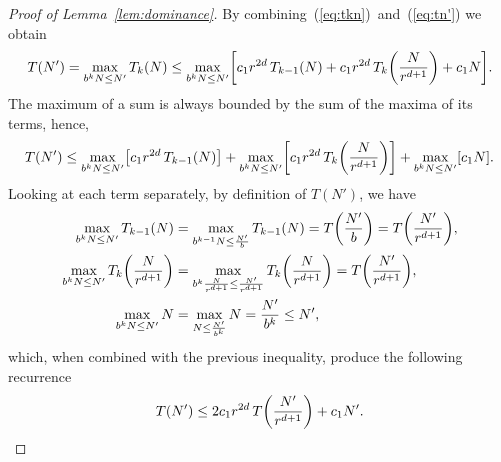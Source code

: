 \begin{proof}[Proof of Lemma~\ref{lem:dominance}]
By combining~(\ref{eq:tkn})~and~(\ref{eq:tn'}) we obtain
\begin{displaymath}
	T(N')
	=
	\max_{b^k N\le N'} T_k(N)
	\le
	\max_{b^k N\le N'} \mleft[
	c_1r^{2d} \,T_{k-1}\mleft(N\mright)
	+ c_1r^{2d} \,T_k\mleft(\frac{N}{r^{d+1}}\mright)
	+ c_1 N\mright].
\end{displaymath}
The maximum of a sum is always bounded by the sum of the maxima of its terms,
hence,
\begin{displaymath}
	T(N')
	\le
	\max_{b^k N\le N'} \mleft[ c_1 r^{2d} \,T_{k-1} \mleft(N\mright)\mright]
	+
	\max_{b^k N\le N'} \mleft[ c_1 r^{2d} \,T_k \mleft(\frac{N}{r^{d+1}}\mright)\mright]
	+
	\max_{b^k N\le N'} \mleft[ c_1 N \mright].
\end{displaymath}
Looking at each term separately, by definition of $T(N')$, we have
\begin{align*}
\max_{b^k N\le N'} T_{k-1}(N)
&=
\max_{b^{k-1} N\le \frac{N'}{b}} T_{k-1}(N)
=
T\mleft(\frac{N'}{b}\mright)
=
T\mleft(\frac{N'}{r^{d+1}}\mright),\\
%
\max_{b^k N\le N'}  T_{k}\mleft(\frac{N}{r^{d+1}}\mright)
&=
\max_{b^k \frac{N}{r^{d+1}} \le \frac{N'}{r^{d + 1}}} T_{k}\mleft(\frac{N}{r^{d+1}} \mright)
=
T\mleft(\frac{N'}{r^{d+1}}\mright),\\
%
\max_{b^k N\le N'} N
&=
\max_{N\le \frac{N'}{b^k}} N
=
\frac{N'}{b^k} \le N',
\end{align*}
which, when combined with the previous inequality, produce the following recurrence
\begin{displaymath}
	T(N') \le 2 c_1 r^{2d} \,T\mleft(\frac{N'}{r^{d+1}}\mright) + c_1 N'.
\end{displaymath}


\end{proof}
